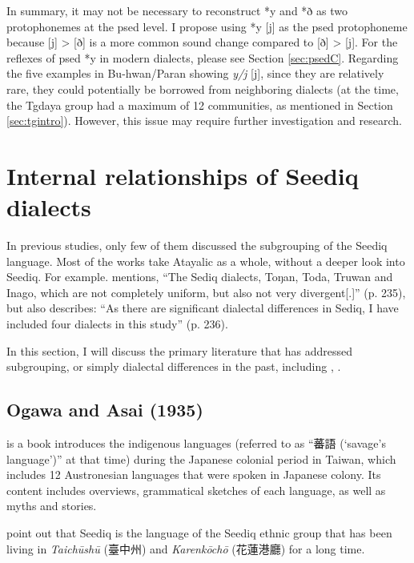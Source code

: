 In summary, it may not be necessary to reconstruct *y and *ð as two protophonemes at the \acl{psed} level. I propose using *y [j] as the \acl{psed} protophoneme because [j] > [ð] is a more common sound change compared to [ð] > [j]. For the reflexes of \acl{psed} *y in modern dialects, please see Section \ref{sec:psedC}. Regarding the five examples in Bu-hwan/Paran showing \textit{y/j} [j], since they are relatively rare, they could potentially be borrowed from neighboring dialects (at the time, the Tgdaya group had a maximum of 12 communities, as mentioned in Section \ref{sec:tgintro}). However, this issue may require further investigation and research.

\section{Internal relationships of Seediq dialects} \label{sec:subgrouping_lit}

In previous studies, only few of them discussed the subgrouping of the Seediq language. Most of the works take Atayalic as a whole, without a deeper look into Seediq. For example. \textcite{li1981paic} mentions, ``The Sediq dialects, Toŋan, Toda, Truwan and Inago, which are not completely uniform, but also not very divergent[.]'' (p. 235), but also describes: ``As there are significant dialectal differences in Sediq, I have included four dialects in this study'' (p. 236).

In this section, I will discuss the primary literature that has addressed subgrouping, or simply dialectal differences in the past, including \textcite{ogawaandasai1935}, \textcite{Chengetal2017Truku, Chengetal2019Tgdaya, Sung2018Sedgrammar}.

\subsection{Ogawa and Asai (1935)}

\textcite{ogawaandasai1935} is a book introduces the indigenous languages (referred to as ``蕃語 (`savage's language')'' at that time) during the Japanese colonial period in Taiwan, which includes 12 Austronesian languages that were spoken in Japanese colony. Its content includes overviews, grammatical sketches of each language, as well as myths and stories.

\textcite{ogawaandasai1935} point out that Seediq is the language of the Seediq ethnic group that has been living in \textit{Taichūshū} (臺中州) and \textit{Karenkōchō} (花蓮港廳) for a long time.

